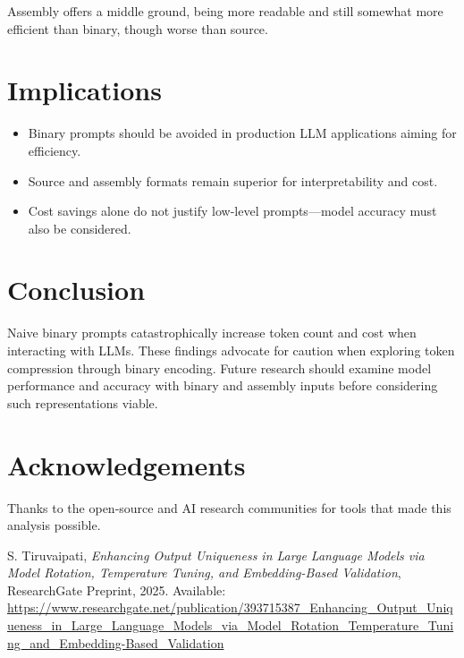 \documentclass{article}
\begin{document}
Assembly offers a middle ground, being more readable and still somewhat more efficient than binary, though worse than source.

\section{Implications}
\begin{itemize}
  \item Binary prompts should be avoided in production LLM applications aiming for efficiency.
  \item Source and assembly formats remain superior for interpretability and cost.
  \item Cost savings alone do not justify low-level prompts—model accuracy must also be considered.
\end{itemize}

\section{Conclusion}
Naive binary prompts catastrophically increase token count and cost when interacting with LLMs. These findings advocate for caution when exploring token compression through binary encoding. Future research should examine model performance and accuracy with binary and assembly inputs before considering such representations viable.

\section*{Acknowledgements}
Thanks to the open-source and AI research communities for tools that made this analysis possible.

\begin{thebibliography}{9}

S. Tiruvaipati,
\textit{Enhancing Output Uniqueness in Large Language Models via Model Rotation, Temperature Tuning, and Embedding-Based Validation}, 
ResearchGate Preprint, 2025.
Available: \url{https://www.researchgate.net/publication/393715387_Enhancing_Output_Uniqueness_in_Large_Language_Models_via_Model_Rotation_Temperature_Tuning_and_Embedding-Based_Validation}

\end{thebibliography}
\end{document}
